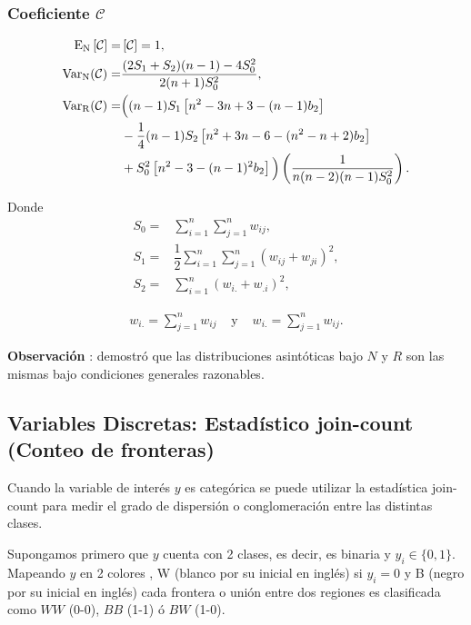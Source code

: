 \subsubsection*{Coeficiente $\mathcal{C}$}
\begin{align}
{\rm{E_N}}\left[\mathcal{C}\right] = &\left[\mathcal{C}\right] = 1, \\
{\rm{Var_N}}(\mathcal{C}) =&\dfrac{(2S_1+S_2)(n-1)-4S_0^2}{2(n+1)S_0^2}, \\
{\rm{Var_R}}(\mathcal{C}) =& \Big( (n-1)S_1 \left[ n^2 -3n +3 -(n-1)b_2 \right] \\ \nonumber
   &- \frac{1}{4} (n-1)S_2 \left[ n^2 +3n -6 -(n^2-n+2)b_2 \right] \\ \nonumber
  &+ S_0^2 \left[ n^2 -3 - (n-1)^2 b_2 \right] \Big) \left( \dfrac{1}{n(n-2)(n-1)S_0^2} \right). \nonumber
\end{align}

Donde 
\begin{align}
  S_0 =& \sum_{i=1}^n \sum_{j=1}^n w_{ij}, \\
  S_1 =& \dfrac{1}{2} \sum_{i=1}^n \sum_{j=1}^n  \left( w_{ij}+w_{ji} \right)^2 , \\
  S_2 =& \sum_{i=1}^n  \left( w_{i.}+w_{.i} \right)^2 , 
\end{align}

\begin{eqnarray}
w_{i.} = \sum_{j=1}^n w_{ij} & \mbox{ y } & w_{i.} = \sum_{j=1}^n w_{ij}.
\end{eqnarray}

\textbf{Observación} \label{obs:nrdist}: \citet{hoeffding52} demostró que las distribuciones asintóticas bajo $N$ y $R$ son las mismas bajo condiciones generales razonables. 

\subsection{Variables Discretas: Estadístico join-count (Conteo de fronteras)}\label{subsec:joincountch}

Cuando la variable de interés $y$ es categórica se puede utilizar la estadística join-count para medir el grado de dispersión o conglomeración entre las distintas clases.

Supongamos primero que $y$ cuenta con 2 clases, es decir, es binaria y $y_{i}\in \lbrace 0,1 \rbrace$. Mapeando $y$ en 2 colores , W (blanco por su inicial en inglés) si $y_{i}=0$ y B (negro por su inicial en inglés) cada frontera o unión entre dos regiones es clasificada como $WW$ (0-0), $BB$  (1-1) ó $BW$ (1-0).

